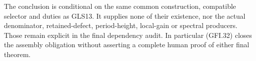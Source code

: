 The conclusion is conditional on the same common construction,
compatible selector and duties as GLS13.  It supplies none of
their existence, nor the actual denominator, retained-defect,
period-height, local-gain or spectral producers.  Those remain
explicit in the final dependency audit.  In particular (GFI.32)
closes the assembly obligation without asserting a complete human
proof of either final theorem.
